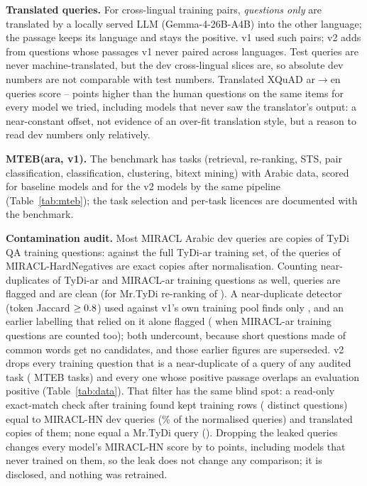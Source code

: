 \documentclass[11pt]{article}
\newcommand{\ardir}{ar$\to$en}
\begin{document}
\textbf{Translated queries.} For cross-lingual training pairs, \emph{questions only} are translated by a locally served LLM (Gemma-4-26B-A4B) into the other language; the passage keeps its language and stays the positive.
v1 used \NumXlOld{} such pairs; v2 adds \NumXlNew{} from questions whose passages v1 never paired across languages.
Test queries are never machine-translated, but the dev cross-lingual slices are, so absolute dev numbers are not comparable with test numbers.
Translated XQuAD \ardir{} queries score \NumStyleOffsetMin{}--\NumStyleOffsetMax{} points higher than the human questions on the same \NumStyleN{} items for every model we tried, including models that never saw the translator's output: a near-constant offset, not evidence of an over-fit translation style, but a reason to read dev numbers only relatively.

\textbf{MTEB(ara, v1).} The benchmark has \NumMtebTasks{} tasks (retrieval, re-ranking, STS, pair classification, classification, clustering, bitext mining) with Arabic data, scored for \NumMtebModels{} baseline models and for the v2 models by the same pipeline (Table~\ref{tab:mteb}); the task selection and per-task licences are documented with the benchmark.

\textbf{Contamination audit.}
Most MIRACL Arabic dev queries are copies of TyDi QA training questions: against the full TyDi-ar training set, \NumMiraclExact{} of the \NumMiraclQueries{} queries of MIRACL-HardNegatives are exact copies after normalisation.
Counting near-duplicates of TyDi-ar and MIRACL-ar training questions as well, \NumMiraclFlagged{} queries are flagged and \NumMiraclCleanN{} are clean (for Mr.TyDi re-ranking \NumNamaaFlagged{} of \NumNamaaQueries{}).
A near-duplicate detector (token Jaccard $\ge 0.8$) used against v1's own training pool finds only \NumMiraclNearDup{}, and an earlier labelling that relied on it alone flagged \NumMiraclJaccardFlagged{} (\NumMiraclJaccardFlaggedBoth{} when MIRACL-ar training questions are counted too); both undercount, because short questions made of common words get no candidates, and those earlier figures are superseded.
v2 drops every training question that is a near-duplicate of a query of any audited task (\NumEvalTasksAudited{} MTEB tasks) and every one whose positive passage overlaps an evaluation positive (Table~\ref{tab:data}).
That filter has the same blind spot: a read-only exact-match check after training found \NumLeakRows{} kept training rows (\NumLeakDistinct{} distinct questions) equal to MIRACL-HN dev queries (\NumLeakShare\% of the normalised queries) and \NumLeakTranslated{} translated copies of them; none equal a Mr.TyDi query (\NumLeakNamaa).
Dropping the leaked queries changes every model's MIRACL-HN score by \NumLeakEffectMin{} to \NumLeakEffectMax{} points, including models that never trained on them, so the leak does not change any comparison; it is disclosed, and nothing was retrained.
\end{document}
